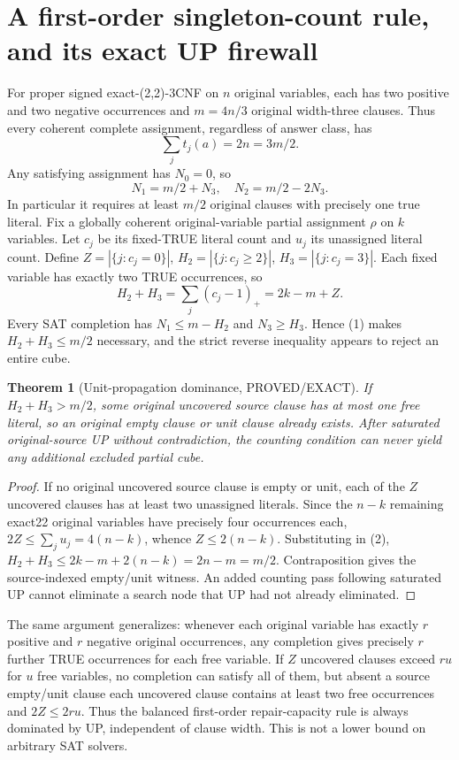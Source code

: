 \documentclass[10pt]{article}
\newtheorem{theorem}{Theorem}
\begin{document}
\section{A first-order singleton-count rule, and its exact UP firewall}
For proper signed exact-(2,2)-3CNF on $n$ original variables, each has two positive and two negative occurrences and $m=4n/3$ original width-three clauses. Thus every coherent complete assignment, regardless of answer class, has
\[
\sum_j t_j(a)=2n=3m/2.
\]
Any satisfying assignment has $N_0=0$, so
\[
\boxed{N_1=m/2+N_3,\quad N_2=m/2-2N_3.}\tag{1}
\]
In particular it requires at least $m/2$ original clauses with precisely one true literal.
Fix a globally coherent original-variable partial assignment $\rho$ on $k$ variables. Let $c_j$ be its fixed-TRUE literal count and $u_j$ its unassigned literal count. Define $Z=|\{j:c_j=0\}|$, $H_2=|\{j:c_j\ge2\}|$, $H_3=|\{j:c_j=3\}|$. Each fixed variable has exactly two TRUE occurrences, so
\[
\boxed{H_2+H_3=\sum_j(c_j-1)_+=2k-m+Z.}\tag{2}
\]
Every SAT completion has $N_1\le m-H_2$ and $N_3\ge H_3$. Hence (1) makes $H_2+H_3\le m/2$ necessary, and the strict reverse inequality appears to reject an entire cube.
\begin{theorem}[Unit-propagation dominance, PROVED/EXACT]
If $H_2+H_3>m/2$, some original uncovered source clause has at most one free literal, so an original empty clause or unit clause already exists. After saturated original-source UP without contradiction, the counting condition can never yield any additional excluded partial cube.
\end{theorem}
\begin{proof}
If no original uncovered source clause is empty or unit, each of the $Z$ uncovered clauses has at least two unassigned literals. Since the $n-k$ remaining exact22 original variables have precisely four occurrences each, $2Z\le\sum_j u_j=4(n-k)$, whence $Z\le2(n-k)$. Substituting in (2),
$H_2+H_3\le2k-m+2(n-k)=2n-m=m/2$.
Contraposition gives the source-indexed empty/unit witness. An added counting pass following saturated UP cannot eliminate a search node that UP had not already eliminated.
\end{proof}
The same argument generalizes: whenever each original variable has exactly $r$ positive and $r$ negative original occurrences, any completion gives precisely $r$ further TRUE occurrences for each free variable. If $Z$ uncovered clauses exceed $ru$ for $u$ free variables, no completion can satisfy all of them, but absent a source empty/unit clause each uncovered clause contains at least two free occurrences and $2Z\le2ru$. Thus the balanced first-order repair-capacity rule is always dominated by UP, independent of clause width. This is not a lower bound on arbitrary SAT solvers.
\end{document}
